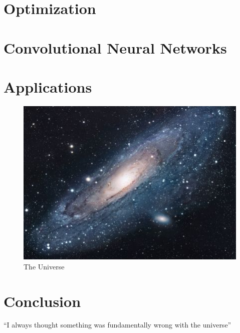 \documentclass{article}
\theoremstyle{definition}
\begin{document}
\section{Optimization}

\section{Convolutional Neural Networks}

\section{Applications}


\begin{figure}[h!]
\centering
\includegraphics[scale=1.7]{universe.jpg}
\caption{The Universe}
\label{fig:univerise}
\end{figure}

\section{Conclusion}
``I always thought something was fundamentally wrong with the universe'' \citep{adams1995hitchhiker}



\end{document}
